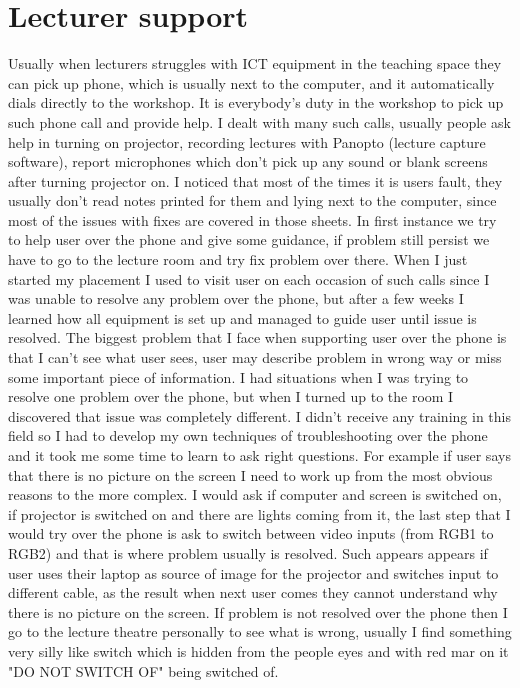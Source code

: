\documentclass[10pt,a4paper,headinclude=true]{report}
\begin{document}
\section{Lecturer support}
Usually when lecturers struggles with ICT equipment in the teaching space they can pick up phone, which is usually next to the computer, and it automatically dials directly to the workshop. It is everybody's duty in the workshop to pick up such phone call and provide help. I dealt with many such calls, usually people ask help in turning on projector, recording lectures with Panopto (lecture capture software), report microphones which don't pick up any sound or blank screens after turning projector on. I noticed that most of the times it is users fault, they usually don't read notes printed for them and lying next to the computer, since most of the issues with fixes are covered in those sheets. In first instance we try to help user over the phone and give some guidance, if problem still persist we have to go to the lecture room and try fix problem over there. When I just started my placement I used to visit user on each occasion of such calls since I was unable to resolve any problem over the phone, but after a few weeks I learned how all equipment is set up and managed to guide user until issue is resolved. The biggest problem that I face when supporting user over the phone is that I can't see what user sees, user may describe problem in wrong way or miss some important piece of information. I had situations when I was trying to resolve one problem over the phone, but when I turned up to the room I discovered that issue was completely different. I didn't receive any training in this field so I had to develop my own techniques of troubleshooting over the phone and it took me some time to learn to ask right questions. For example if user says that there is no picture on the screen I need to work up from the most obvious reasons to the more complex. I would ask if computer and screen is switched on, if projector is switched on and there are lights coming from it, the last step that I would try over the phone is ask to switch between video inputs (from RGB1 to RGB2) and that is where problem usually is resolved. Such appears appears if user uses their laptop as source of image for the projector and switches input to different cable, as the result when next user comes they cannot understand why there is no picture on the screen. If problem is not resolved over the phone then I go to the lecture theatre personally to see what is wrong, usually I find something very silly like switch which is hidden from the people eyes and with red mar on it "DO NOT SWITCH OF" being switched of.  
\end{document}
